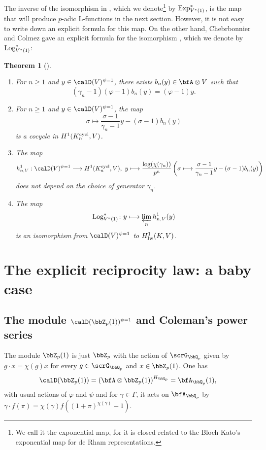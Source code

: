 \documentclass[a4paper,oneside]{amsart}
\newtheorem{theorem}{Theorem}[section]
\numberwithin{equation}{section}
\numberwithin{figure}{section}
\begin{document}
The inverse of the isomorphism  in , which we denote\footnote{We call it the exponential map, for it is closed related to the Bloch-Kato's exponential map for de Rham representations.} by $\operatorname{Exp}^*_{V^*(1)}$, is the map that will produce $p$-adic L-functions in the next section. However, it is not easy to write down an explicit formula for this map. On the other hand, Chebrbonnier and Colmez gave an explicit formula for the isomorphism , which we denote by $\operatorname{Log}^*_{V^*(1)}$:
\begin{theorem}[{\cite[Section I.5, Th\'eor\`eme II.1.3]{cherbonnier_theorie_1999}}]\leavevmode
    \begin{enumerate}
        \item For $n\geq 1$ and $y\in\calD(V)^{\psi=1}$, there exists $b_n(y)\in \bfA\otimes V$ such that $$(\gamma_n-1)(\varphi-1)b_n(y)=(\varphi-1)y.$$
        \item For $n\geq 1$ and $y\in\calD(V)^{\psi=1}$, the map
              $$\sigma\longmapsto \frac{\sigma-1}{\gamma_n-1}y-(\sigma-1)b_n(y)$$
              is a cocycle in $H^1(K_n^{\operatorname{cycl}},V)$.
        \item The map
              $$h_{n,V}^1:\calD(V)^{\psi=1}\lto H^1(K_n^{\opn{cycl}},V),\ y\longmapsto \frac{\log(\chi(\gamma_n))}{p^n}\left(\sigma\longmapsto \frac{\sigma-1}{\gamma_n-1}y-(\sigma-1)b_n(y)\right)$$
              does not depend on the choice of generator $\gamma_n$.
        \item The map $$\operatorname{Log}^*_{V^*(1)}\colon y\longmapsto \varprojlim_n h_{n,V}^1(y)$$ is an isomorphism from $\calD(V)^{\psi=1}$ to $H_{\operatorname{Iw}}^1(K,V)$.
    \end{enumerate}
\end{theorem}
\section{The explicit reciprocity law: a baby case}
\subsection{The module $\calD(\bbZ_p(1))^{\psi=1}$ and Coleman's power series}
The module $\bbZ_p(1)$ is just $\bbZ_p$ with the action of $\scrG_{\bbQ_p}$ given by $g\cdot x=\chi(g)x$ for every $g\in\scrG_{\bbQ_p}$ and $x\in\bbZ_p(1)$. One has
$$\calD(\bbZ_p(1))=\left(\bfA\otimes\bbZ_p(1)\right)^{H_{\bbQ_p}}=\bfA_{\bbQ_p}(1),$$
with usual actions of $\varphi$ and $\psi$ and for $\gamma\in\Gamma$, it acts on $\bfA_{\bbQ_p}$ by $\gamma\cdot f(\pi)=\chi(\gamma)f((1+\pi)^{\chi(\gamma)}-1)$.
\end{document}

